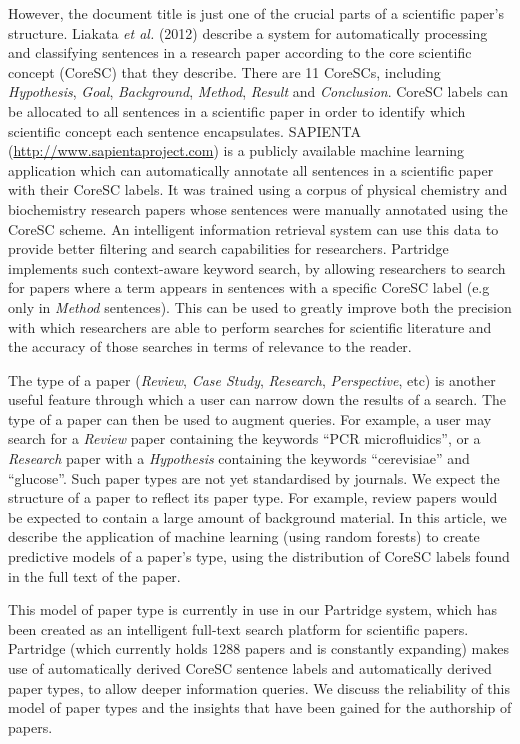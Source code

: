 \documentclass{svmult}
\begin{document}
However, the document title is just one of the crucial parts of a scientific
paper's structure.  Liakata \emph{et al.} (2012) describe a system for
automatically processing and classifying sentences in a research paper
according to the core scientific concept (CoreSC) that they
describe\cite{Liakata2012}.  There are 11 CoreSCs, including {\em Hypothesis},
{\em Goal}, {\it Background}, {\em Method}, {\em Result} and {\em Conclusion}.
CoreSC labels can be allocated to all sentences in a scientific paper in order
to identify which scientific concept each sentence encapsulates.  SAPIENTA
(\url{http://www.sapientaproject.com}) is a publicly available machine learning
application which can automatically annotate all sentences in a scientific
paper with their CoreSC labels. It was trained using a corpus of physical
chemistry and biochemistry research papers whose sentences were manually
annotated using the CoreSC\cite{LIAKATA10.644} scheme.  An intelligent 
information retrieval system can use this data to provide better filtering and
search capabilities for researchers.  Partridge implements such context-aware
keyword search, by allowing researchers to search for papers where a term
appears in sentences with a specific CoreSC label (e.g only in {\em Method}
sentences). This can be used to greatly improve both the precision with which
researchers are able to perform searches for scientific literature and the
accuracy of those searches in terms of relevance to the reader.

The type of a paper ({\em Review}, {\em Case Study}, {\em Research}, {\em
Perspective}, etc) is another useful feature through which a user can narrow
down the results of a search.  The type of a paper can then be used to augment
queries.  For example, a user may search for a {\em Review} paper containing
the keywords ``PCR microfluidics'', or a {\em Research} paper with a {\em
Hypothesis} containing the keywords ``cerevisiae'' and ``glucose''.   Such
paper types are not yet standardised by journals.  We expect the structure of a
paper to reflect its paper type.  For example, review papers would be expected
to contain a large amount of background material.  In this article, we describe
the application of machine learning (using random forests) to create predictive
models of a paper's type, using the distribution of CoreSC labels found in the
full text of the paper. 

This model of paper type is currently in use in our Partridge system, which has
been created as an intelligent full-text search platform for scientific papers.
Partridge (which currently holds 1288 papers and is constantly expanding) 
makes use of automatically derived CoreSC sentence labels and
automatically derived paper types, to allow deeper information queries.  We
discuss the reliability of this model of paper types and the insights that have
been gained for the authorship of papers.
\end{document}
